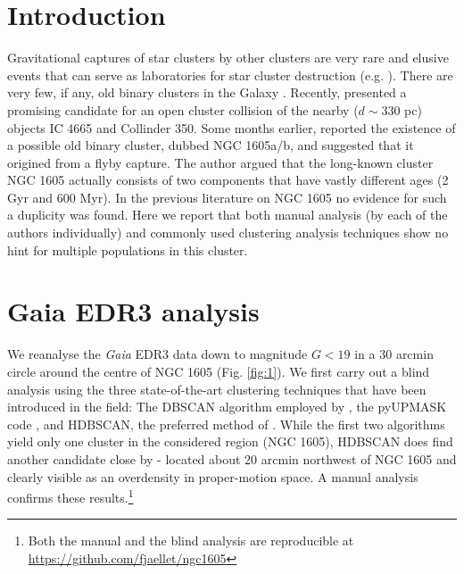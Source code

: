 \documentclass[RNAAS]{aastex631}
\begin{document}
\section{Introduction}
Gravitational captures of star clusters by other clusters are very rare and elusive events that can serve as laboratories for star cluster destruction (e.g. \citealt{Soubiran2018}). There are very few, if any, old binary clusters in the Galaxy \citep{Casado2022}. Recently, \citet{Piatti2022} presented a promising candidate for an open cluster collision of the nearby ($d\sim330$ pc) objects IC 4665 and Collinder 350.
Some months earlier, \citet{Camargo2021} reported the existence of a possible old binary cluster, dubbed NGC 1605a/b, and suggested that it origined from a flyby capture. The author argued that the long-known cluster NGC 1605 actually consists of two components that have vastly different ages (2 Gyr and 600 Myr). 
In the previous literature on NGC 1605 no evidence for such a duplicity was found. Here we report that both manual analysis (by each of the authors individually) and commonly used clustering analysis techniques show no hint for multiple populations in this cluster. 

\section{Gaia EDR3 analysis}
We reanalyse the {\it Gaia} EDR3 data \citep{Gaia2021} down to magnitude $G<19$ in a 30 arcmin circle around the centre of NGC 1605 (Fig. \ref{fig:1}). We first carry out a blind analysis using the three state-of-the-art clustering techniques that have been introduced in the field: The DBSCAN algorithm employed by \citet{Castro2022}, the pyUPMASK code \citep{Pera2021}, and HDBSCAN, the preferred method of \citet{Hunt2021}. 
While the first two algorithms yield only one cluster in the considered region (NGC 1605), HDBSCAN does find another candidate close by - located about 20 arcmin northwest of NGC 1605 and clearly visible as an overdensity in proper-motion space. A manual analysis confirms these results.\footnote{Both the manual and the blind analysis are reproducible at \url{https://github.com/fjaellet/ngc1605}}
\end{document}
